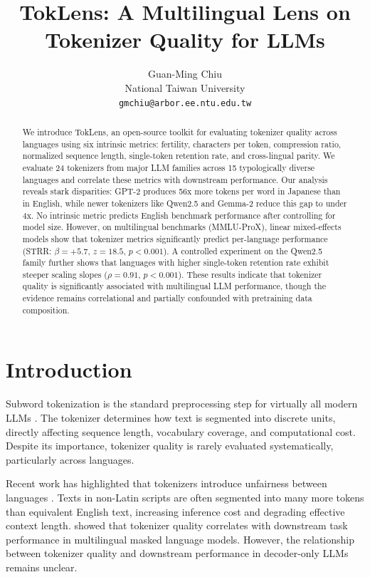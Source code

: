 \documentclass[11pt]{article}
\title{TokLens: A Multilingual Lens on Tokenizer Quality for LLMs}
\author{Guan-Ming Chiu \\
  National Taiwan University \\
  \texttt{gmchiu@arbor.ee.ntu.edu.tw} \\}
\begin{document}
\raggedbottom
\maketitle

\begin{abstract}
We introduce TokLens, an open-source toolkit for evaluating tokenizer quality across languages using six intrinsic metrics: fertility, characters per token, compression ratio, normalized sequence length, single-token retention rate, and cross-lingual parity. We evaluate 24 tokenizers from major LLM families across 15 typologically diverse languages and correlate these metrics with downstream performance. Our analysis reveals stark disparities: GPT-2 produces 56x more tokens per word in Japanese than in English, while newer tokenizers like Qwen2.5 and Gemma-2 reduce this gap to under 4x. No intrinsic metric predicts English benchmark performance after controlling for model size. However, on multilingual benchmarks (MMLU-ProX), linear mixed-effects models show that tokenizer metrics significantly predict per-language performance (STRR: $\beta = +5.7$, $z = 18.5$, $p < 0.001$). A controlled experiment on the Qwen2.5 family further shows that languages with higher single-token retention rate exhibit steeper scaling slopes ($\rho = 0.91$, $p < 0.001$). These results indicate that tokenizer quality is significantly associated with multilingual LLM performance, though the evidence remains correlational and partially confounded with pretraining data composition.
\end{abstract}

\section{Introduction}

Subword tokenization is the standard preprocessing step for virtually all modern LLMs \citep{sennrich-etal-2016-neural, kudo-richardson-2018-sentencepiece}. The tokenizer determines how text is segmented into discrete units, directly affecting sequence length, vocabulary coverage, and computational cost. Despite its importance, tokenizer quality is rarely evaluated systematically, particularly across languages.

Recent work has highlighted that tokenizers introduce unfairness between languages \citep{petrov-etal-2024-language, ahia-etal-2023-languages}. Texts in non-Latin scripts are often segmented into many more tokens than equivalent English text, increasing inference cost and degrading effective context length. \citet{rust-etal-2021-good} showed that tokenizer quality correlates with downstream task performance in multilingual masked language models. However, the relationship between tokenizer quality and downstream performance in decoder-only LLMs remains unclear.
\end{document}
